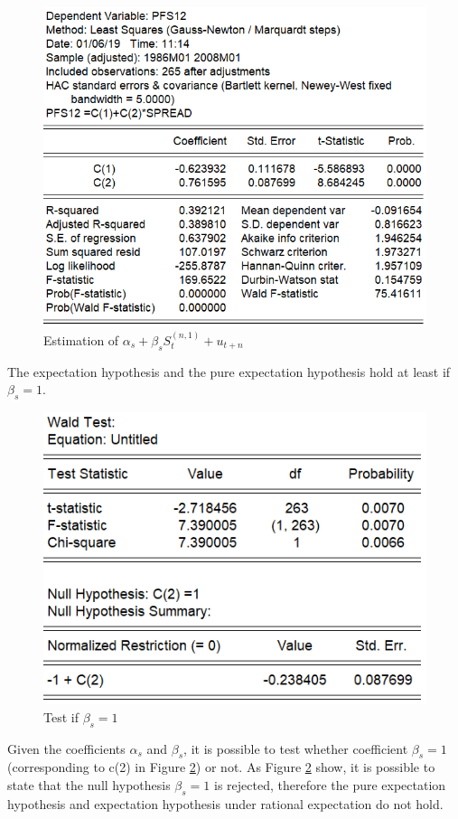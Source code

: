 \documentclass[12pt]{article}
\begin{document}
\begin{figure}[H]
\centering
\includegraphics[scale=1]{expectation_hypothesis.PNG} 
\caption{Estimation of $\alpha_s + \beta_s S^{(n,1)}_t +u_{t+n}$ \label{fig:expectationhypothesis}}
\end{figure}
\noindent The expectation hypothesis and the pure expectation hypothesis hold at least if $\beta_s = 1$.
\begin{figure}[H]
\centering
\includegraphics[scale=1]{beta_hypothesis_test.PNG} 
\caption{Test if $ \beta_s=1$\label{fig:betahypothesistest}}
\end{figure}
\noindent Given the coefficients $\alpha_s$ and $\beta_s$, it is possible to test whether coefficient $\beta_s = 1$ (corresponding to c(2) in Figure \ref{fig:betahypothesistest}) or not. As Figure \ref{fig:betahypothesistest} show, it is possible to state that the null hypothesis $\beta_s=1$ is rejected, therefore the pure expectation hypothesis and expectation hypothesis under rational expectation do not hold.
\end{document}
